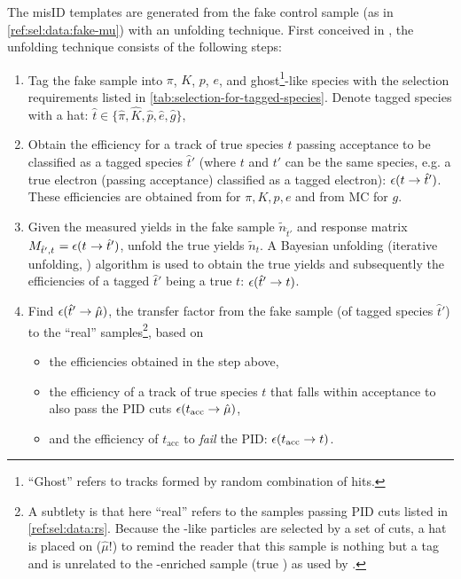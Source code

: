 The misID templates are generated from the fake \muon control sample
(as in \cref{ref:sel:data:fake-mu}) with an unfolding technique.
First conceived in \cite{LHCb-ANA-2016-059}, the unfolding technique
consists of the following steps:
\begin{enumerate}
    \item Tag the fake \muon sample into $\pi$, $K$, $p$,
        $e$, and ghost\footnote{
            ``Ghost'' refers to tracks formed by random combination of hits.
        }-like species with the selection requirements listed in
        \cref{tab:selection-for-tagged-species}.
        Denote tagged species with a hat:
        $\hat{t} \in \{\hat{\pi}, \hat{K}, \hat{p}, \hat{e}, \hat{g}\}$,

    \item Obtain the efficiency for a track of true species $t$ passing \muon
        acceptance to be classified as a tagged species $\hat{t}'$
        (where $t$ and $t'$ can be the same species, e.g. a true electron
        (passing \muon acceptance) classified as a tagged electron):
        $\misEff[t]{\hat{t}'}$.
        These efficiencies are obtained from \pidcalib for $\pi, K, p, e$ and
        from MC for $g$.

    \item Given the measured yields in the fake \muon sample $\tilde{n}_{\hat{t}'}
        $ and response matrix
        $M_{\hat{t}', t^{\phantom{}}} = \misEff[t^{\phantom{}}]{\hat{t}'}$,
        unfold the true yields $\tilde{n}_{t}$.
        A Bayesian unfolding (iterative unfolding, \cite{DAGOSTINI1995487})
        algorithm is used to obtain the true yields and subsequently the
        efficiencies of a tagged
        $\hat{t}'$ being a true $t$: $\misEff[\hat{t}']{t}$.

      \item Find $\misEff[\hat{t}']{\hat{\mu}}$,
        the transfer factor from the fake \muon sample
        (of tagged species $\hat{t}'$) to the ``real'' \muon
        samples\footnote{
            A subtlety is that here ``real'' \muon refers to the samples passing
            \muon PID cuts listed in \cref{ref:sel:data:rs}.
            Because the \muon-like particles are selected by a set of cuts,
            a hat is placed on \muon ($\hat{\mu}$!)
            to remind the reader that this sample is nothing but a \muon tag
            and is unrelated to the \muon-enriched sample (true \muon) as used
            by \pidcalib.
        },
        based on
        \begin{itemize}
            \item the efficiencies obtained in the step above,
            \item the efficiency of a track of true species $t$ that falls
                within \muon acceptance to also pass the \muon PID cuts
                $\misEff[t_\text{acc}]{\hat{\mu}}$,
            \item and the efficiency of $t_\text{acc}$ to \emph{fail} the \muon
                PID:
                $\misEff[t_\text{acc}]{t}$.
        \end{itemize}


\end{enumerate}
